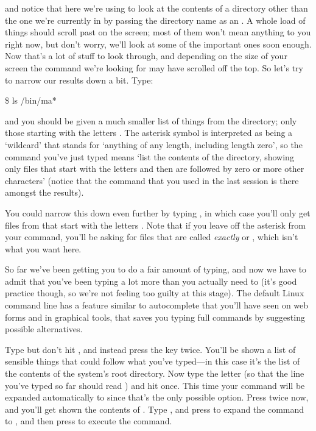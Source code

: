 and notice that here we're using  to look at the contents of a directory other than the one we're currently in by passing the directory name as an . A whole load of things should scroll past on the screen; most of them won't mean anything to you right now, but don't worry, we'll look at some of the important ones soon enough. Now that's a lot of stuff to look through, and depending on the size of your screen the command we're looking for may have scrolled off the top. So let's try to narrow our results down a bit. Type:

\begin{ttoutenv}
\$ ls /bin/ma*
\end{ttoutenv}


and you should be given a much smaller list of things from the  directory; only those starting with the letters . The asterisk symbol is interpreted as being a `wildcard' that stands for `anything of any length, including length zero', so the command you've just typed means `list the contents of the  directory, showing only files that start with the letters  and then are followed by zero or more other characters' (notice that the  command that you used in the last session is there amongst the results).

You could narrow this down even further by typing , in which case you'll only get files from  that start with the letters . Note that if you leave off the asterisk from your command, you'll be asking for files that are called \textit{exactly}  or , which isn't what you want here.

So far we've been getting you to do a fair amount of typing, and now we have to admit that you've been typing a lot more than you actually need to (it's good practice though, so we're not feeling too guilty at this stage). The default Linux command line has a feature similar to autocomplete that you'll have seen on web forms and in graphical tools, that saves you typing full commands by suggesting possible alternatives.

Type  but don't hit , and instead press the  key twice. You'll be shown a list of sensible things that could follow what you've typed---in this case it's the list of the contents of the system's root directory. Now type the letter  (so that the line you've typed so far should read ) and hit  once. This time your command will be expanded automatically to  since that's the only possible option. Press  twice now, and you'll get shown the contents of . Type , and press  to expand the command to , and then press  to execute the command.

